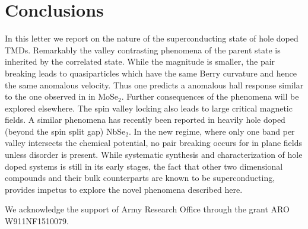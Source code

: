 \section{Conclusions}

In this letter we report on the nature of the superconducting state
of hole doped TMDs.
Remarkably the valley contrasting phenomena of the parent state
is inherited by the correlated state.
While the magnitude is smaller, the pair breaking leads to quasiparticles
which have the same Berry curvature and hence the same anomalous velocity.
Thus one predicts a anomalous hall response similar to
the one observed in in MoSe$_{2}$.
Further consequences of the phenomena will be explored elsewhere.
The spin valley locking also leads to large critical magnetic fields.
A similar phenomena has recently been reported in heavily hole doped
(beyond the spin split gap) NbSe$_{2}$.
In the new regime, where only one band per valley intersects
the chemical potential, no pair breaking occurs
for in plane fields unless disorder is present.
While systematic synthesis and characterization of hole doped systems
is still in its early stages, the fact that other two dimensional compounds
and their bulk counterparts are known to be superconducting,
provides impetus to explore the novel phenomena described here.

We acknowledge the support of Army Research Office through the grant
ARO W911NF1510079.
